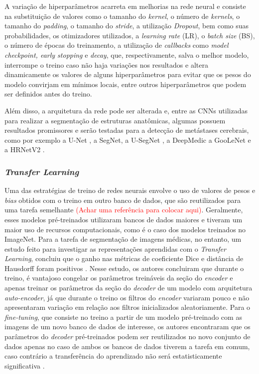 A variação de hiperparâmetros acarreta em melhorias na rede neural e consiste na substituição de valores como o tamanho do \textit{kernel}, o número de \textit{kernels}, o tamanho do \textit{padding}, o tamanho do \textit{stride}, a utilização \textit{Dropout}, bem como suas probabilidades, os otimizadores utilizados, a \textit{learning rate} (LR), o \textit{batch size} (BS), o número de épocas do treinamento, a utilização de \textit{callbacks} como \textit{model checkpoint, early stopping} e \textit{decay}, que, respectivamente, salva o melhor modelo, interrompe o treino caso não haja variações nos resultados e altera dinamicamente os valores de alguns hiperparâmetros para evitar que os pesos do modelo convirjam em mínimos locais, entre outros hiperparâmetros que podem ser definidos antes do treino.

Além disso, a arquitetura da rede pode ser alterada e, entre as CNNs utilizadas para realizar a segmentação de estruturas anatômicas, algumas possuem resultados promissores e serão testadas para a detecção de metástases cerebrais, como por exemplo a U-Net \cite{Ronneberger:2015}, a SegNet\cite{Badrinarayanan:2017}, a U-SegNet \cite{Kumar:2018}, a DeepMedic \cite{Kamnitsas:2017} a GooLeNet \cite{Grovik:2020} e a HRNetV2 \cite{Sun:2019}. 

\subsubsection{\textit{Transfer Learning}}

Uma das estratégias de treino de redes neurais envolve o uso de valores de pesos e \textit{bias} obtidos com o treino em outro banco de dados, que são reutilizados para uma tarefa semelhante \textcolor{red}{(Achar uma referência para colocar aqui)}. Geralmente, esses modelos pré-treinados utilizaram bancos de dados maiores e tiveram um maior uso de recursos computacionais, como é o caso dos modelos treinados no ImageNet. Para a tarefa de segmentação de imagens médicas, no entanto, um estudo feito para investigar as representações aprendidas com o \textit{Transfer Learning}, concluiu que o ganho nas métricas de coeficiente Dice e distância de Hausdorff foram positivos \cite{Karimi:2021}. Nesse estudo, os autores concluiram que durante o treino, é vantajoso congelar os parâmetros treináveis da seção do \textit{encoder} e apenas treinar os parâmetros da seção do \textit{decoder} de um modelo com arquitetura \textit{auto-encoder}, já que durante o treino os filtros do \textit{encoder} variaram pouco e não apresentaram variação em relação aos filtros inicializados aleatoriamente. Para o \textit{fine-tuning}, que consiste no treino a partir de um modelo pré-treinado com as imagens de um novo banco de dados de interesse, os autores encontraram que os parâmetros do \textit{decoder} pré-treinados podem ser reutilizados no novo conjunto de dados apenas no caso de ambos os bancos de dados tiverem a tarefa em comum, caso contrário a transferência do aprendizado não será estatisticamente significativa \cite{Karimi:2021}.

